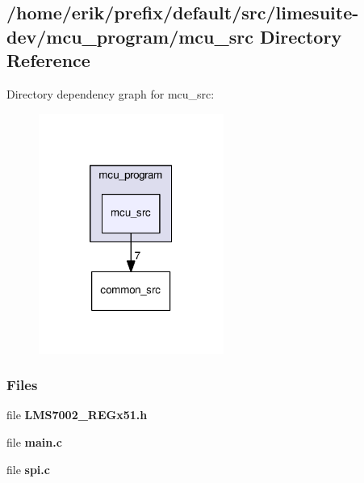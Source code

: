 \subsection{/home/erik/prefix/default/src/limesuite-\/dev/mcu\+\_\+program/mcu\+\_\+src Directory Reference}
\label{dir_74dddcce137f3280b3221f5871c9f0e6}
Directory dependency graph for mcu\+\_\+src\+:
\nopagebreak
\begin{figure}[H]
\begin{center}
\leavevmode
\includegraphics[width=172pt]{dir_74dddcce137f3280b3221f5871c9f0e6_dep}
\end{center}
\end{figure}
\subsubsection*{Files}
\begin{DoxyCompactItemize}
\item 
file {\bf L\+M\+S7002\+\_\+\+R\+E\+Gx51.\+h}
\item 
file {\bf main.\+c}
\item 
file {\bf spi.\+c}
\end{DoxyCompactItemize}
